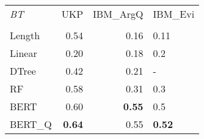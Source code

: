 \begin{tabular}{lrrl}
\toprule
\textit{BT} &   UKP &  IBM\_ArgQ & IBM\_Evi \\
  &       &           &         \\
\midrule
Length &  0.54 &      0.16 &    0.11 \\
Linear &  0.20 &      0.18 &     0.2 \\
DTree  &  0.42 &      0.21 &       - \\
RF     &  0.58 &      0.31 &     0.3 \\
BERT   &  0.60 &      \textbf{0.55} &     0.5 \\
BERT\_Q &  \textbf{0.64} &      0.55 &    \textbf{0.52} \\
\bottomrule
\end{tabular}
